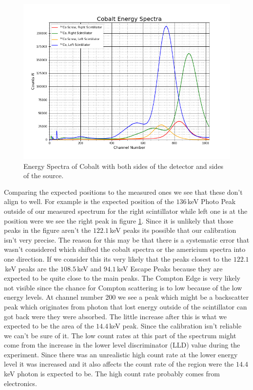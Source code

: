 \documentclass[30pt,a4paper]{article}
\begin{document}
	\begin{figure}[h]
		\includegraphics[scale=0.5]{Bilder/Cobalt_Energy_Spectra1}
		\centering
		\caption{Energy Spectra of Cobalt with both sides of the detector and sides of the source.}
		\label{4cobaltspectra}
	\end{figure}
	Comparing the expected positions to the measured ones we see that these don't align to well. For example is the expected position of the $136\,$keV Photo Peak outside of our measured spectrum for the right scintillator while left one is at the position were we see the right peak in figure \ref{4cobaltspectra}. Since it is unlikely that those peaks in the figure aren't the $122.1$\,keV peaks its possible that our calibration isn't very precise. The reason for this may be that there is a systematic error that wasn't considered which shifted the cobalt spectra or the americium spectra into one direction. If we consider this its very likely that the peaks closest to the $122.1$\,keV peaks are the $108.5\,$keV and $94.1\,$keV Escape Peaks because they are expected to be quite close to the main peaks. The Compton Edge is very likely not visible since the chance for Compton scattering is to low because of the low energy levels. At channel number 200 we see a peak which might be a backscatter peak which originates from photon that lost energy outside of the scintillator can got back were they were absorbed. The little increase after this is what we expected to be the  area of the $14.4\,$keV peak. Since the calibration isn't reliable we can't be sure of it. The low count rates at this part of the spectrum might come from the increase in the lower level discriminator (LLD) value during the experiment. Since there was an unrealistic high count rate at the lower energy level it was increased and it also affects the count rate of the region were the $14.4$\,keV photon is expected to be. The high count rate probably comes from electronics. 
\end{document}
